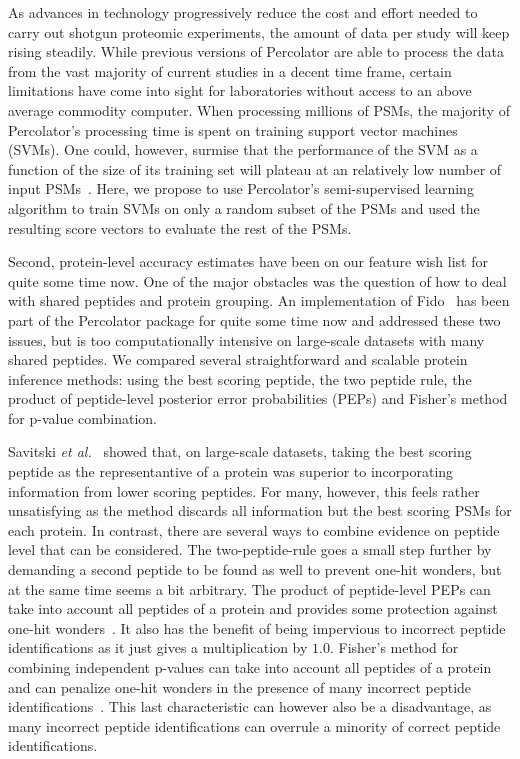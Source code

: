 \documentclass{article}
\begin{document}
As advances in technology progressively reduce the cost and effort
needed to carry out shotgun proteomic experiments, the amount of data
per study will keep rising steadily. While previous versions of
Percolator are able to process the data from the vast majority of
current studies in a decent time frame, certain limitations have come
into sight for laboratories without access to an above average
commodity computer. When processing millions of PSMs, the majority of
Percolator’s processing time is spent on training support vector
machines (SVMs). One could, however, surmise that the performance of
the SVM as a function of the size of its training set will plateau at
an relatively low number of input PSMs~\cite{gonnelli2015decoy}. Here,
we propose to use Percolator’s semi-supervised learning algorithm to
train SVMs on only a random subset of the PSMs and used the resulting
score vectors to evaluate the rest of the PSMs.

Second, protein-level accuracy estimates have been on our feature wish
list for quite some time now. One of the major obstacles was the
question of how to deal with shared peptides and protein grouping. An
implementation of Fido~\cite{serang2010efficient} has been part of the
Percolator package for quite some time now and addressed these two
issues, but is too computationally intensive on large-scale
datasets with many shared peptides. We compared several
straightforward and scalable protein inference methods: using the
best scoring peptide, the two peptide rule, the product of
peptide-level posterior error probabilities (PEPs) and Fisher’s method
for p-value combination.

Savitski {\em et al.}~\cite{savitski2015scalable} showed that, on
large-scale datasets, taking the best scoring peptide as the
representantive of a protein was superior to incorporating information
from lower scoring peptides. For many, however, this feels rather
unsatisfying as the method discards all information but the best
scoring PSMs for each protein.  In contrast, there are several ways to
combine evidence on peptide level that can be considered. The
two-peptide-rule goes a small step further by demanding a second
peptide to be found as well to prevent one-hit wonders, but at the
same time seems a bit arbitrary. The product of peptide-level PEPs can
take into account all peptides of a protein and provides some
protection against one-hit wonders~\cite{cox2008maxquant}. It also has
the benefit of being impervious to incorrect peptide identifications
as it just gives a multiplication by $1.0$. Fisher's method for
combining independent p-values can take into account all peptides of a
protein and can penalize one-hit wonders in the presence of many
incorrect peptide
identifications~\cite{spirin2011assigning,alves2015mass,
granholm2013determining}. This last characteristic can however also be
a disadvantage, as many incorrect peptide identifications can overrule
a minority of correct peptide identifications.
\end{document}
